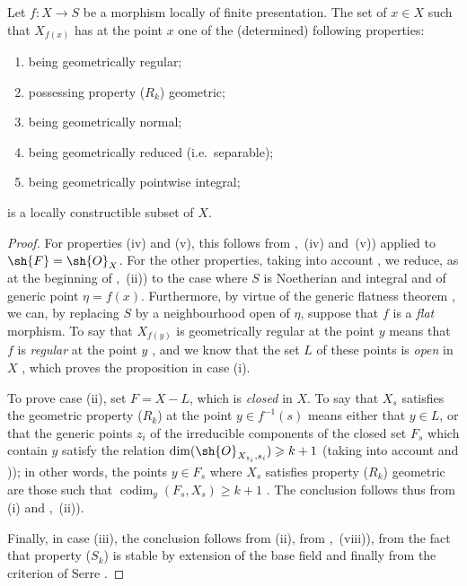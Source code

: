 \begin{proposition}[9.9.4]
\label{IV.9.9.4}
Let $f:X\to S$ be a morphism locally of finite presentation.
The set of $x\in X$ such that $X_{f(x)}$ has at the point $x$ one of the (determined) following properties:
\begin{enumerate}[label=(\roman*)]
  \item being geometrically regular;
  \item possessing property ($R_k$) geometric;
  \item being geometrically normal;
  \item being geometrically reduced (i.e.\ separable);
  \item being geometrically pointwise integral;
\end{enumerate}
is a locally constructible subset of $X$.
\end{proposition}

\begin{proof}
\label{IV.9.9.4-proof}
For properties (iv) and (v), this follows from ,~(iv) and~(v)) applied to $\sh{F}=\sh{O}_X$.
For the other properties, taking into account , we reduce, as at the beginning of ,~(ii)) to the case where $S$ is Noetherian and integral and of generic point $\eta=f(x)$.
Furthermore, by virtue of the generic flatness theorem , we can, by replacing $S$ by a neighbourhood open of $\eta$, suppose that $f$ is a \emph{flat} morphism.
To say that $X_{f(y)}$ is geometrically regular at the point $y$ means that $f$ is \emph{regular} at the point $y$ , and we know that the set $L$ of these points is \emph{open} in $X$ , which proves the proposition in case (i).

To prove case (ii), set $F=X-L$, which is \emph{closed} in $X$.
To say that $X_s$
satisfies the geometric property ($R_k$) at the point $y\in f^{-1}(s)$ means either that $y\in L$, or that the generic points $z_i$ of the irreducible components of the closed set $F_s$ which contain $y$ satisfy the relation $\dim(\sh{O}_{X_{z_i},s_i})\geqslant k+1$ (taking into account  and )); in other words, the points $y\in F_s$ where $X_s$ satisfies property ($R_k$) geometric are those such that $\operatorname{codim}_y(F_s,X_s)\geqslant k+1$ .
The conclusion follows thus from (i) and ,~(ii)).

Finally, in case (iii), the conclusion follows from (ii), from ,~(viii)), from the fact that property ($S_k$) is stable by extension of the base field  and finally from the criterion of Serre .
\end{proof}

